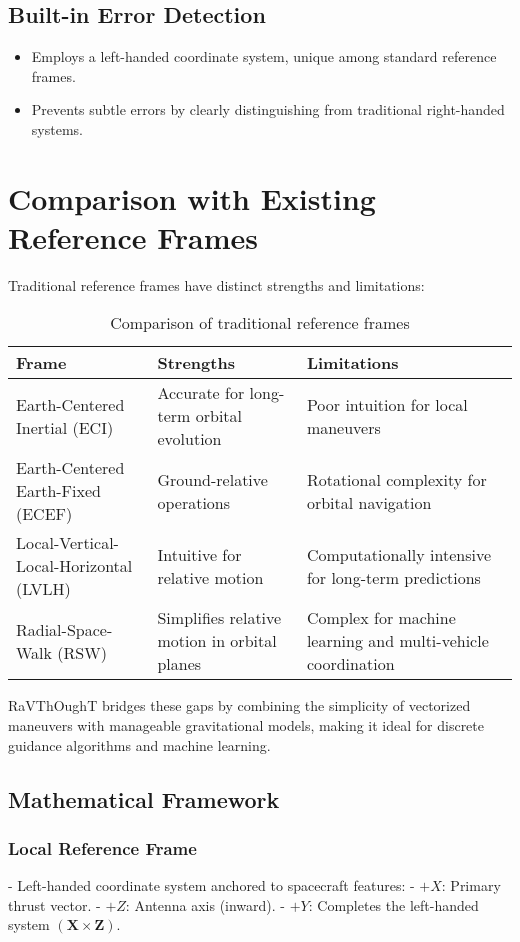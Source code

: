 \subsection{Built-in Error Detection}
\begin{itemize}
	\item Employs a left-handed coordinate system, unique among standard reference frames.
	\item Prevents subtle errors by clearly distinguishing from traditional right-handed systems.
\end{itemize}

\section{Comparison with Existing Reference Frames}

Traditional reference frames have distinct strengths and limitations:

\begin{table}[h!]
\centering
\begin{tabular}{|l|l|l|}
\hline
\textbf{Frame} & \textbf{Strengths} & \textbf{Limitations} \\
\hline
Earth-Centered Inertial (ECI) & Accurate for long-term orbital evolution & Poor intuition for local maneuvers \\
Earth-Centered Earth-Fixed (ECEF) & Ground-relative operations & Rotational complexity for orbital navigation \\
Local-Vertical-Local-Horizontal (LVLH) & Intuitive for relative motion & Computationally intensive for long-term predictions \\
Radial-Space-Walk (RSW) & Simplifies relative motion in orbital planes & Complex for machine learning and multi-vehicle coordination \\
\hline
\end{tabular}
\caption{Comparison of traditional reference frames}
\end{table}

RaVThOughT bridges these gaps by combining the simplicity of vectorized maneuvers with manageable gravitational models, making it ideal for discrete guidance algorithms and machine learning.

\subsection{Mathematical Framework}

\subsubsection{Local Reference Frame}
- Left-handed coordinate system anchored to spacecraft features:
  - \(+X\): Primary thrust vector.
  - \(+Z\): Antenna axis (inward).
  - \(+Y\): Completes the left-handed system \((\mathbf{X} \times \mathbf{Z})\).

